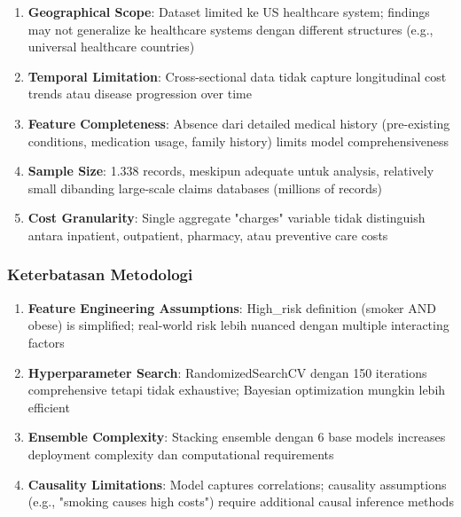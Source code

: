\begin{enumerate}
    \item \textbf{Geographical Scope}: Dataset limited ke US healthcare system; findings may not generalize ke healthcare systems dengan different structures (e.g., universal healthcare countries)

    \item \textbf{Temporal Limitation}: Cross-sectional data tidak capture longitudinal cost trends atau disease progression over time

    \item \textbf{Feature Completeness}: Absence dari detailed medical history (pre-existing conditions, medication usage, family history) limits model comprehensiveness

    \item \textbf{Sample Size}: 1.338 records, meskipun adequate untuk analysis, relatively small dibanding large-scale claims databases (millions of records)

    \item \textbf{Cost Granularity}: Single aggregate "charges" variable tidak distinguish antara inpatient, outpatient, pharmacy, atau preventive care costs
\end{enumerate}

\subsubsection{Keterbatasan Metodologi}

\begin{enumerate}
    \item \textbf{Feature Engineering Assumptions}: High\_risk definition (smoker AND obese) is simplified; real-world risk lebih nuanced dengan multiple interacting factors

    \item \textbf{Hyperparameter Search}: RandomizedSearchCV dengan 150 iterations comprehensive tetapi tidak exhaustive; Bayesian optimization mungkin lebih efficient

    \item \textbf{Ensemble Complexity}: Stacking ensemble dengan 6 base models increases deployment complexity dan computational requirements

    \item \textbf{Causality Limitations}: Model captures correlations; causality assumptions (e.g., "smoking causes high costs") require additional causal inference methods
\end{enumerate}

